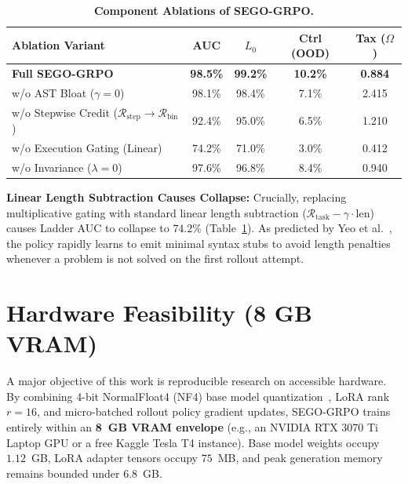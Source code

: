 \documentclass[10pt,twocolumn,letterpaper]{article}
\newcommand{\Rstep}{\mathcal{R}_{\text{step}}}
\begin{document}
\begin{table}[h]
\centering
\small
\caption{\textbf{Component Ablations of SEGO-GRPO.}}
\label{tab:ablations}
\begin{tabular}{lcccc}
\toprule
\textbf{Ablation Variant} & \textbf{AUC} & \textbf{$L_0$} & \textbf{Ctrl (OOD)} & \textbf{Tax ($\Omega$)} \\
\midrule
\textbf{Full SEGO-GRPO} & \textbf{98.5\%} & \textbf{99.2\%} & \textbf{10.2\%} & \textbf{0.884} \\
w/o AST Bloat ($\gamma=0$) & 98.1\% & 98.4\% & 7.1\% & 2.415 \\
w/o Stepwise Credit ($\Rstep \rightarrow \mathcal{R}_{\text{bin}}$) & 92.4\% & 95.0\% & 6.5\% & 1.210 \\
w/o Execution Gating (Linear) & 74.2\% & 71.0\% & 3.0\% & 0.412 \\
w/o Invariance ($\lambda=0$) & 97.6\% & 96.8\% & 8.4\% & 0.940 \\
\bottomrule
\end{tabular}
\end{table}

\textbf{Linear Length Subtraction Causes Collapse:} Crucially, replacing multiplicative gating with standard linear length subtraction ($\mathcal{R}_{\text{task}} - \gamma \cdot \text{len}$) causes Ladder AUC to collapse to $74.2\%$ (Table~\ref{tab:ablations}). As predicted by Yeo et al.~\cite{yeo2025demystifying}, the policy rapidly learns to emit minimal syntax stubs to avoid length penalties whenever a problem is not solved on the first rollout attempt.

\section{Hardware Feasibility (8 GB VRAM)}
\label{sec:hardware}

A major objective of this work is reproducible research on accessible hardware. By combining 4-bit NormalFloat4 (NF4) base model quantization~\cite{dettmers2023qlora}, LoRA rank $r=16$, and micro-batched rollout policy gradient updates, SEGO-GRPO trains entirely within an \textbf{8~GB VRAM envelope} (e.g., an NVIDIA RTX 3070 Ti Laptop GPU or a free Kaggle Tesla T4 instance). Base model weights occupy $1.12$~GB, LoRA adapter tensors occupy $75$~MB, and peak generation memory remains bounded under $6.8$~GB.
\end{document}
